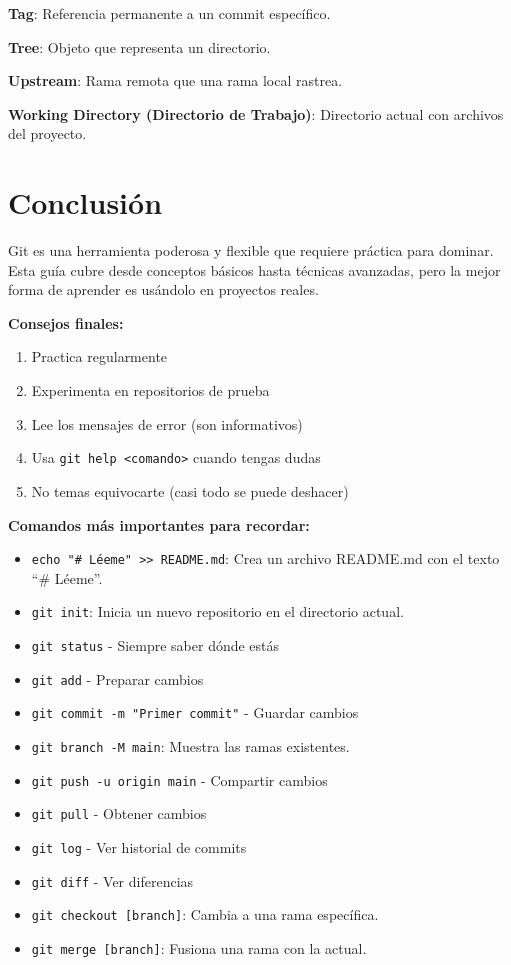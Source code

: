 \documentclass[
  doc,
  floatsintext,
  longtable,
  a4paper,
  nolmodern,
  notxfonts,
  notimes,
  12pt,
  colorlinks=true,linkcolor=blue,citecolor=blue,urlcolor=blue]{apa7}
\providecommand{\tightlist}{%
  \setlength{\itemsep}{0pt}\setlength{\parskip}{0pt}}
\begin{document}
\textbf{Tag}: Referencia permanente a un commit específico.

\textbf{Tree}: Objeto que representa un directorio.

\textbf{Upstream}: Rama remota que una rama local rastrea.

\textbf{Working Directory (Directorio de Trabajo)}: Directorio actual
con archivos del proyecto.

\section{Conclusión}\label{conclusiuxf3n}

Git es una herramienta poderosa y flexible que requiere práctica para
dominar. Esta guía cubre desde conceptos básicos hasta técnicas
avanzadas, pero la mejor forma de aprender es usándolo en proyectos
reales.

\textbf{Consejos finales:}

\begin{enumerate}
\def\labelenumi{\arabic{enumi}.}
\tightlist
\item
  Practica regularmente
\item
  Experimenta en repositorios de prueba
\item
  Lee los mensajes de error (son informativos)
\item
  Usa \texttt{git\ help\ \textless{}comando\textgreater{}} cuando tengas
  dudas
\item
  No temas equivocarte (casi todo se puede deshacer)
\end{enumerate}

\textbf{Comandos más importantes para recordar:}

\begin{itemize}
\tightlist
\item
  \texttt{echo\ "\#\ Léeme"\ \textgreater{}\textgreater{}\ README.md}:
  Crea un archivo README.md con el texto ``\# Léeme''.
\item
  \texttt{git\ init}: Inicia un nuevo repositorio en el directorio
  actual.
\item
  \texttt{git\ status} - Siempre saber dónde estás
\item
  \texttt{git\ add} - Preparar cambios
\item
  \texttt{git\ commit\ -m\ "Primer\ commit"} - Guardar cambios
\item
  \texttt{git\ branch\ -M\ main}: Muestra las ramas existentes.
\item
  \texttt{git\ push\ -u\ origin\ main} - Compartir cambios
\item
  \texttt{git\ pull} - Obtener cambios
\item
  \texttt{git\ log} - Ver historial de commits
\item
  \texttt{git\ diff} - Ver diferencias
\item
  \texttt{git\ checkout\ {[}branch{]}}: Cambia a una rama específica.
\item
  \texttt{git\ merge\ {[}branch{]}}: Fusiona una rama con la actual.
\end{itemize}
\end{document}
